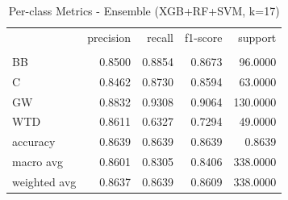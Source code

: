 \begin{table}
\caption{Per-class Metrics - Ensemble (XGB+RF+SVM, k=17)}
\label{tab:ensemble_per_class}
\begin{tabular}{lrrrr}
\toprule
 & precision & recall & f1-score & support \\
 &  &  &  &  \\
\midrule
BB & 0.8500 & 0.8854 & 0.8673 & 96.0000 \\
C & 0.8462 & 0.8730 & 0.8594 & 63.0000 \\
GW & 0.8832 & 0.9308 & 0.9064 & 130.0000 \\
WTD & 0.8611 & 0.6327 & 0.7294 & 49.0000 \\
accuracy & 0.8639 & 0.8639 & 0.8639 & 0.8639 \\
macro avg & 0.8601 & 0.8305 & 0.8406 & 338.0000 \\
weighted avg & 0.8637 & 0.8639 & 0.8609 & 338.0000 \\
\bottomrule
\end{tabular}
\end{table}
